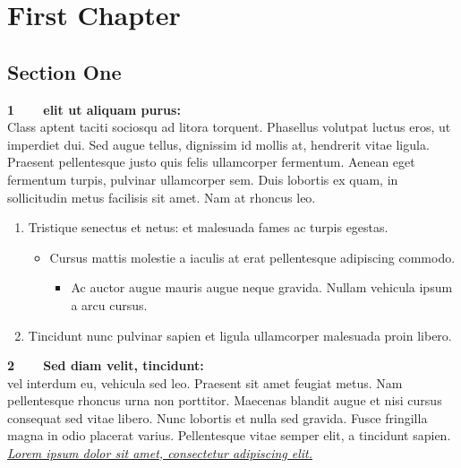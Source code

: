 \documentclass[a4paper]{book}
\begin{document}
\chapter{First Chapter}
\section{Section One}
\begin{flushleft}
    {\bf \Large 1\ \ \ \ elit ut aliquam purus:}\\
    \Large Class aptent taciti sociosqu ad litora torquent.
    Phasellus volutpat luctus eros, ut imperdiet dui.
    Sed augue tellus, dignissim id mollis at, hendrerit vitae ligula.
    Praesent pellentesque justo quis felis ullamcorper fermentum.
    Aenean eget fermentum turpis, pulvinar ullamcorper sem.
    Duis lobortis ex quam, in sollicitudin metus facilisis sit amet. Nam at rhoncus leo.
    \begin{enumerate}
        \item [1.] Tristique senectus et netus: et malesuada fames ac turpis egestas.
              \begin{itemize}
                  \item Cursus mattis molestie a iaculis at erat pellentesque adipiscing commodo.
                        \begin{itemize}
                            \item Ac auctor augue mauris augue neque gravida. Nullam vehicula ipsum a arcu cursus.
                        \end{itemize}
              \end{itemize}
        \item [2.] Tincidunt nunc pulvinar sapien et ligula ullamcorper malesuada proin libero.
    \end{enumerate}
    \vspace{.5cm}
    {\bf \Large 2\ \ \ \ Sed diam velit, tincidunt:}\\
    \Large vel interdum eu, vehicula sed leo.
    Praesent sit amet feugiat metus. Nam pellentesque rhoncus urna non porttitor.
    Maecenas blandit augue et nisi cursus consequat sed vitae libero.
    Nunc lobortis et nulla sed gravida. Fusce fringilla magna in odio placerat varius.
    Pellentesque vitae semper elit, a tincidunt sapien.\\
    \vspace{.5cm}
    {\em \underline{Lorem ipsum dolor sit amet, consectetur adipiscing elit.}}
\end{flushleft}
\end{document}
